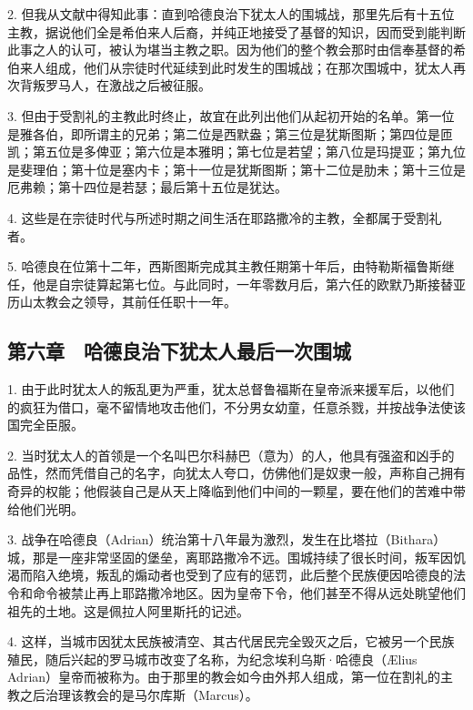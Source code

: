 2. 但我从文献中得知此事：直到哈德良治下犹太人的围城战，那里先后有十五位主教，据说他们全是希伯来人后裔，并纯正地接受了基督的知识，因而受到能判断此事之人的认可，被认为堪当主教之职。因为他们的整个教会那时由信奉基督的希伯来人组成，他们从宗徒时代延续到此时发生的围城战；在那次围城中，犹太人再次背叛罗马人，在激战之后被征服。\par

3. 但由于受割礼的主教此时终止，故宜在此列出他们从起初开始的名单。第一位是雅各伯，即所谓主的兄弟；第二位是西默盎；第三位是犹斯图斯；第四位是匝凯；第五位是多俾亚；第六位是本雅明；第七位是若望；第八位是玛提亚；第九位是斐理伯；第十位是塞内卡；第十一位是犹斯图斯；第十二位是肋未；第十三位是厄弗赖；第十四位是若瑟；最后第十五位是犹达。\par

4. 这些是在宗徒时代与所述时期之间生活在耶路撒冷的主教，全都属于受割礼者。\par

5. 哈德良在位第十二年，西斯图斯完成其主教任期第十年后，由特勒斯福鲁斯继任，他是自宗徒算起第七位。与此同时，一年零数月后，第六任的欧默乃斯接替亚历山太教会之领导，其前任任职十一年。\par


\subsection{第六章　哈德良治下犹太人最后一次围城}

1. 由于此时犹太人的叛乱更为严重，犹太总督鲁福斯在皇帝派来援军后，以他们的疯狂为借口，毫不留情地攻击他们，不分男女幼童，任意杀戮，并按战争法使该国完全臣服。\par

2. 当时犹太人的首领是一个名叫巴尔科赫巴（意为）的人，他具有强盗和凶手的品性，然而凭借自己的名字，向犹太人夸口，仿佛他们是奴隶一般，声称自己拥有奇异的权能；他假装自己是从天上降临到他们中间的一颗星，要在他们的苦难中带给他们光明。\par

3. 战争在哈德良（Adrian）统治第十八年最为激烈，发生在比塔拉（Bithara）城，那是一座非常坚固的堡垒，离耶路撒冷不远。围城持续了很长时间，叛军因饥渴而陷入绝境，叛乱的煽动者也受到了应有的惩罚，此后整个民族便因哈德良的法令和命令被禁止再上耶路撒冷地区。因为皇帝下令，他们甚至不得从远处眺望他们祖先的土地。这是佩拉人阿里斯托的记述。\par

4. 这样，当城市因犹太民族被清空、其古代居民完全毁灭之后，它被另一个民族殖民，随后兴起的罗马城市改变了名称，为纪念埃利乌斯·哈德良（Ælius Adrian）皇帝而被称为。由于那里的教会如今由外邦人组成，第一位在割礼的主教之后治理该教会的是马尔库斯（Marcus）。\par

